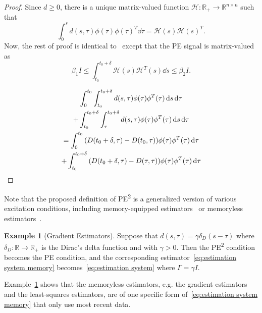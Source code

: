 \documentclass[]{IEEEtran}
\theoremstyle{definition}
\newtheorem{example}{Example}
\theoremstyle{remark}
\newcommand{\MB}[1]{\mathbb{#1}}
\newcommand{\MC}[1]{\mathcal{#1}}
\newcommand{\tsup}[1]{\textsuperscript{#1}}
\begin{document}
\begin{proof}
	Since $d \ge0 $, there is a unique matrix-valued function $\MC{H} :
	\MB{R}_{+} \to \MB{R}^{n \times n}$ such that
	\begin{equation*}
		\int_0^s d(s, \tau) \phi(\tau) \phi(\tau)^T \dd{\tau} = \MC{H}(s)
		\MC{H}(s)^T.
	\end{equation*}
	Now, the rest of proof is identical
	to~\cite[Theorem~1]{anderson_exponential_1977} except that the PE signal is
	matrix-valued as
	\begin{equation*}
		\beta_1 I \le \int_{t_0}^{t_0 + \delta} \MC{H}(s) \MC{H}^T(s) \dd{s}
		\le \beta_2 I.
	\end{equation*}

	\begin{gather*}
		\int_0^{t_0}{\int_{t_0}^{t_0 + \delta}{d(s, \tau) \phi(\tau) \phi^T(\tau)
		\dd{s}}\dd{\tau}}\\
		+ \int_{t_0}^{t_0 + \delta}{\int_{\tau}^{t_0 + \delta}{d(s, \tau)
		\phi(\tau) \phi^T(\tau) \dd{s}}\dd{\tau}} \\
		= \int_0^{t_0}{\qty(D(t_0 + \delta, \tau) - D(t_0, \tau)) \phi(\tau)
		\phi^T(\tau) \dd{\tau}} \\
		+ \int_{t_0}^{t_0 + \delta}{\qty(D(t_0 + \delta, \tau) - D(\tau, \tau))
		\phi(\tau) \phi^T(\tau) \dd{\tau}}
	\end{gather*}
\end{proof}

Note that the proposed definition of PE\tsup{2} is a generalized version of
various excitation conditions, including memory-equipped
estimators~\cite{chowdhary_exponential_2014, pan_composite_2018,
	cho_composite_2018} or memoryless estimators~\cite{anderson_exponential_1977,
slotine_composite_1989}.

\begin{example}[Gradient Estimators]
	\label{ex:gradient estimators}
	Suppose that $d(s, \tau) = \gamma \delta_D(s -
	\tau)$ where $\delta_D : \MB{R} \to \MB{R}_{+}$ is the Dirac's delta function
	and with $\gamma > 0$. Then the PE\tsup{2} condition becomes the PE condition,
	and the corresponding estimator~\eqref{eq:estimation system memory}
	becomes~\eqref{eq:estimation system} where $\Gamma = \gamma I$.
\end{example}

Example~\ref{ex:gradient estimators} shows that the memoryless estimators, e.g.
the gradient estimators and the least-squares estimators, are of one specific
form of~\eqref{eq:estimation system memory} that only use most recent data.
\end{document}

